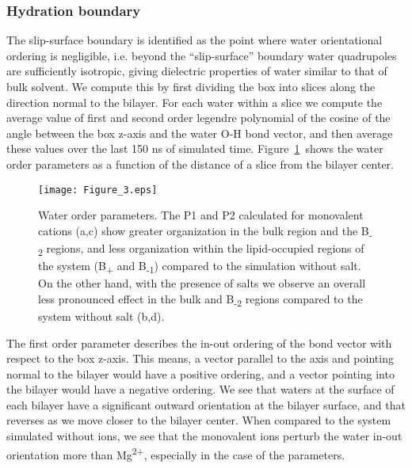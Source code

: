 \subsubsection{Hydration boundary}
The slip-surface boundary is identified as the point where 
water orientational ordering is negligible, i.e.
beyond the ``slip-surface'' 
boundary water {quadrupoles} are {sufficiently isotropic,
giving dielectric properties of water similar to that of bulk solvent}.
We compute this by first dividing the box into 
slices along the direction normal to the bilayer. 
For each water within a slice we 
compute the average value of first and second order legendre polynomial of 
the cosine of the angle between the box z-axis and
the water O-H bond vector, and then average these values over the last 150 ns of simulated time.
Figure~\ref{figch3:h2order}~shows the water order parameters 
as a function of the distance of a slice from the bilayer center.
\begin{figure}[H]
    \caption[Water orientational order parameters]{Water order parameters.   
        {The P1 and P2 calculated for monovalent cations (a,c) show greater 
            organization in the bulk region and the B\textsubscript{-2} regions, and less organization within 
            the lipid-occupied regions of the system (B\textsubscript{+} and B\textsubscript{-1}) compared to the simulation without salt. 
        } 
{On the other hand, with the presence of \mg{} salts we observe an overall less pronounced effect in the
bulk and B\textsubscript{-2} regions compared to the system without salt (b,d).}
}
    
    \label{figch3:h2order}
    \texttt{[image: Figure\_3.eps]}
\end{figure}

The first order parameter describes the in-out ordering of the bond vector with respect to the 
box z-axis. This means, a vector parallel to the axis and pointing normal to the bilayer would have a positive
ordering, and a vector pointing into the bilayer would have a negative ordering. We see that waters at the surface
of each bilayer have a significant outward orientation at the bilayer surface, and that reverses as we move
closer to the bilayer center. When compared to the system simulated without ions, we see that
the monovalent ions perturb the water in-out orientation 
more than Mg\textsuperscript{2+}, especially in the case of the \mgmicro{}
parameters.

